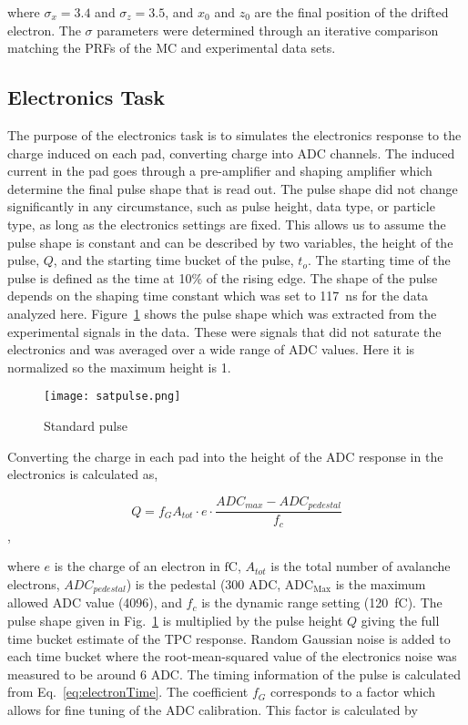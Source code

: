 where $\sigma_x = 3.4$ and $\sigma_z = 3.5$, and $x_0$ and $z_0$ are the final position of the drifted electron. The $\sigma$ parameters were determined through an iterative comparison matching the PRFs of the MC and experimental data sets. 


\subsection{Electronics Task}

The purpose of the electronics task is to simulates the electronics response to the charge induced on each pad, converting charge into ADC channels. The induced current in the pad goes through a pre-amplifier and shaping amplifier which determine the final pulse shape that is read out. The pulse shape did not change significantly in any circumstance, such as pulse height, data type, or particle type, as long as the electronics settings are fixed. This allows us to assume the pulse shape is constant and can be described by two variables, the height of the pulse, $Q$, and the starting time bucket of the pulse, $t_o$. The starting time of the pulse is defined as the time at 10\% of the rising edge. The shape of the pulse depends on the shaping time constant which was set to \SI{117}{\nano\second} for the data analyzed here. Figure~\ref{fig:pulseshape} shows the pulse shape which was extracted from the experimental signals in the data. These were signals that did not saturate the electronics and was averaged over a wide range of ADC values. Here it is normalized so the maximum height is 1. 



\begin{figure}[!htb]
    \centering       
    \texttt{[image: satpulse.png]} 
    \caption{Standard pulse }
    \label{fig:pulseshape}
\end{figure}


Converting the charge in each pad into the height of the ADC response in the electronics is calculated as, 

\begin{equation}
Q = f_G  A_{tot} \cdot e \cdot\frac{ADC_{max} - ADC_{pedestal}}{f_c}
\label{eq:etoADC}
\end{equation},

where $e$ is the charge of an electron in $\si{\femto \coulomb}$, $A_{tot}$ is the total number of avalanche electrons, $ADC_{pedestal}$) is the pedestal (300 ADC, $\mathrm{ADC_{Max}}$ is the maximum allowed ADC value (4096), and $f_c$ is the dynamic range setting (\SI{120}{\femto\coulomb}). The pulse shape given in Fig.~\ref{fig:pulseshape} is multiplied by the pulse height $Q$ giving the full time bucket estimate of the TPC response. Random Gaussian noise is added to each time bucket where the root-mean-squared value of the electronics noise was measured to be around 6 ADC. The timing information of the pulse is calculated from Eq.~\ref{eq:electronTime}. The coefficient $f_G$ corresponds to a factor which allows for fine tuning of the ADC calibration. This factor is calculated by

